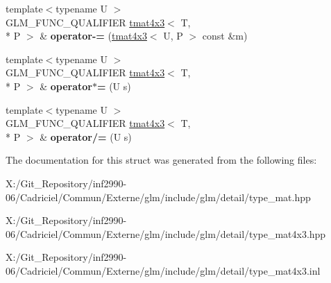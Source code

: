 \begin{DoxyCompactItemize}
\item 
\hypertarget{structglm_1_1detail_1_1tmat4x3_ae99d5b3f57c8ba0e43b95d50c3652e14}{{\footnotesize template$<$typename U $>$ }\\G\-L\-M\-\_\-\-F\-U\-N\-C\-\_\-\-Q\-U\-A\-L\-I\-F\-I\-E\-R \hyperlink{structglm_1_1detail_1_1tmat4x3}{tmat4x3}$<$ T, \\*
P $>$ \& {\bfseries operator-\/=} (\hyperlink{structglm_1_1detail_1_1tmat4x3}{tmat4x3}$<$ U, P $>$ const \&m)}\label{structglm_1_1detail_1_1tmat4x3_ae99d5b3f57c8ba0e43b95d50c3652e14}

\item 
\hypertarget{structglm_1_1detail_1_1tmat4x3_a2a6ffe1017bd2b4d1b74d45d8d90e90e}{{\footnotesize template$<$typename U $>$ }\\G\-L\-M\-\_\-\-F\-U\-N\-C\-\_\-\-Q\-U\-A\-L\-I\-F\-I\-E\-R \hyperlink{structglm_1_1detail_1_1tmat4x3}{tmat4x3}$<$ T, \\*
P $>$ \& {\bfseries operator$\ast$=} (U s)}\label{structglm_1_1detail_1_1tmat4x3_a2a6ffe1017bd2b4d1b74d45d8d90e90e}

\item 
\hypertarget{structglm_1_1detail_1_1tmat4x3_a990634b567ee79dbd2cfc3ea469e57fb}{{\footnotesize template$<$typename U $>$ }\\G\-L\-M\-\_\-\-F\-U\-N\-C\-\_\-\-Q\-U\-A\-L\-I\-F\-I\-E\-R \hyperlink{structglm_1_1detail_1_1tmat4x3}{tmat4x3}$<$ T, \\*
P $>$ \& {\bfseries operator/=} (U s)}\label{structglm_1_1detail_1_1tmat4x3_a990634b567ee79dbd2cfc3ea469e57fb}

\end{DoxyCompactItemize}


The documentation for this struct was generated from the following files\-:\begin{DoxyCompactItemize}
\item 
X\-:/\-Git\-\_\-\-Repository/inf2990-\/06/\-Cadriciel/\-Commun/\-Externe/glm/include/glm/detail/type\-\_\-mat.\-hpp\item 
X\-:/\-Git\-\_\-\-Repository/inf2990-\/06/\-Cadriciel/\-Commun/\-Externe/glm/include/glm/detail/type\-\_\-mat4x3.\-hpp\item 
X\-:/\-Git\-\_\-\-Repository/inf2990-\/06/\-Cadriciel/\-Commun/\-Externe/glm/include/glm/detail/type\-\_\-mat4x3.\-inl\end{DoxyCompactItemize}
